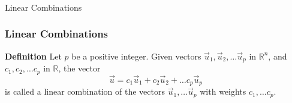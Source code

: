  \begin{frame}[fragile]\frametitle{}
\begin{center}
{\Large Linear Combinations}
\end{center}
\end{frame}




  \begin{frame}[fragile]\frametitle{Linear Combinations}
\textbf{Definition}
Let $p$ be a positive integer. Given vectors $\vec{u}_1, \vec{u}_2, \dots \vec{u}_p$
in $\mathbb R^n$, and $c_1, c_2, \dots c_p$ in $\mathbb R$, the vector
\[
 \vec{u} = c_1 \vec{u}_1 + c_2 \vec{u}_2 + \dots c_p\vec{u}_p
\]
is called a linear combination of the vectors $\vec{u}_1, \dots \vec{u}_p$ with
weights $c_1, \dots c_p$.

\end{frame}

